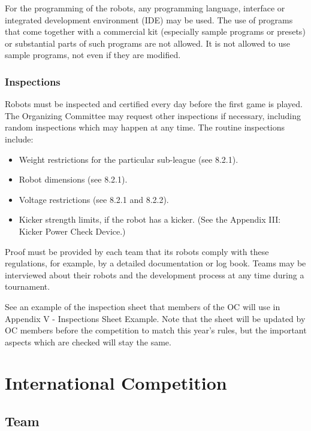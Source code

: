\documentclass{article}
\begin{document}
For the programming of the robots, any programming language, interface or
integrated development environment (IDE) may be used. The use of programs that
come together with a commercial kit (especially sample programs or presets) or
substantial parts of such programs are not allowed. It is not allowed to use
sample programs, not even if they are modified.

\subsubsection{Inspections \label{ref-059}}

Robots must be inspected and certified every day before the first game is
played. The Organizing Committee may request other inspections if necessary,
including random inspections which may happen at any time. The routine
inspections include:

\begin{itemize}
\item Weight restrictions for the particular sub-league (see 8.2.1).

\item Robot dimensions (see 8.2.1).

\item Voltage restrictions (see 8.2.1 and 8.2.2).

\item Kicker strength limits, if the robot has a kicker. (See the Appendix III: Kicker Power Check Device.)
\end{itemize}

Proof must be provided by each team that its robots comply with these
regulations, for example, by a detailed documentation or log book. Teams may be
interviewed about their robots and the development process at any time during a
tournament.

See an example of the inspection sheet that members of the OC will use in
Appendix V - Inspections Sheet Example. Note that the sheet will be updated by
OC members before the competition to match this year's rules, but the important
aspects which are checked will stay the same.


\newpage

\section{International Competition}

\subsection{Team}
\end{document}
